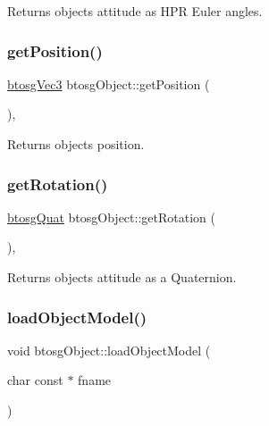 Returns object\textquotesingle{}s attitude as H\+PR Euler angles. \mbox{\label{classbtosgObject_a3dadd5da8f2a312e44a039446b93d4cd}} 
\subsubsection{\texorpdfstring{get\+Position()}{getPosition()}}
{\footnotesize\ttfamily \hyperlink{classbtosgVec3}{btosg\+Vec3} btosg\+Object\+::get\+Position (\begin{DoxyParamCaption}{ }\end{DoxyParamCaption})\hspace{0.3cm}{\ttfamily [inline]}, {\ttfamily [inherited]}}

Returns object\textquotesingle{}s position. \mbox{\label{classbtosgObject_a3b825999ad3a51bde743d4085ff19dae}} 
\subsubsection{\texorpdfstring{get\+Rotation()}{getRotation()}}
{\footnotesize\ttfamily \hyperlink{classbtosgQuat}{btosg\+Quat} btosg\+Object\+::get\+Rotation (\begin{DoxyParamCaption}{ }\end{DoxyParamCaption})\hspace{0.3cm}{\ttfamily [inline]}, {\ttfamily [inherited]}}

Returns object\textquotesingle{}s attitude as a Quaternion. \mbox{\label{classbtosgObject_a91838b8235579da178fcc06e6d3d47f3}} 
\subsubsection{\texorpdfstring{load\+Object\+Model()}{loadObjectModel()}}
{\footnotesize\ttfamily void btosg\+Object\+::load\+Object\+Model (\begin{DoxyParamCaption}\item[{char const $\ast$}]{fname }\end{DoxyParamCaption})\hspace{0.3cm}{\ttfamily [inherited]}}

